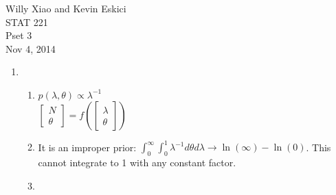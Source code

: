 \documentclass[paper=a4, fontsize=11pt]{scrartcl}
\begin{document}
\noindent Willy Xiao and Kevin Eskici \\ STAT 221 \\Pset 3\\ Nov 4, 2014
\begin{enumerate}
  \item
    \begin{enumerate}[1]
      
      \item   $p(\lambda, \theta) \propto \lambda^{-1}$\\
      $\begin{bmatrix} N \\ \theta \end{bmatrix} = f(\begin{bmatrix} \lambda \\ \theta \end{bmatrix})$

      \item It is an improper prior: $\int_0^\infty{\int_0^1{\lambda^{-1}}}d\theta d\lambda \rightarrow \ln(\infty) - \ln(0)$. This cannot integrate to 1 with any constant factor.
	
	\item      
      
    \end{enumerate}
\end{enumerate}
\end{document}
